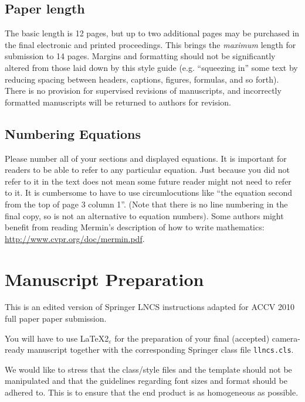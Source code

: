 \documentclass[runningheads]{llncs}
\begin{document}
\subsection{Paper length}

The basic length is 12 pages, but up to two additional pages may be
purchased in the final electronic and printed proceedings. This brings the {\em
maximum} length for submission to 14 pages. Margins and
formatting should not be significantly altered from those
laid down by this style guide (e.g. ``squeezing in'' some text by reducing
spacing between headers, captions, figures, formulas, and so forth).  There is no 
provision for supervised revisions of manuscripts, and incorrectly 
formatted manuscripts will be returned to authors for revision.

\subsection{Numbering Equations}

Please number all of your sections and displayed equations.  It is 
important for readers to be able to refer
to any particular equation.  Just because you did not refer to it in
the text does not mean some future reader might not need to refer to
it.  It is cumbersome to have to use circumlocutions like ``the
equation second from the top of page 3 column 1''.  (Note that there
is no line numbering in the final copy, so is not an
alternative to equation numbers).  Some authors might benefit from
reading Mermin's description of how to write mathematics:
\url{http://www.cvpr.org/doc/mermin.pdf}.

\section{Manuscript Preparation}

This is an edited version of Springer LNCS instructions adapted for
ACCV 2010 full paper paper submission. 

You will have to use \LaTeX2$_\varepsilon$ for the
preparation of your final (accepted)
camera-ready manuscript together with the corresponding Springer
class file \verb+llncs.cls+.

We would like to stress that the class/style files and the template
should not be manipulated and that the guidelines regarding font sizes
and format should be adhered to. This is to ensure that the end product
is as homogeneous as possible.
\end{document}

